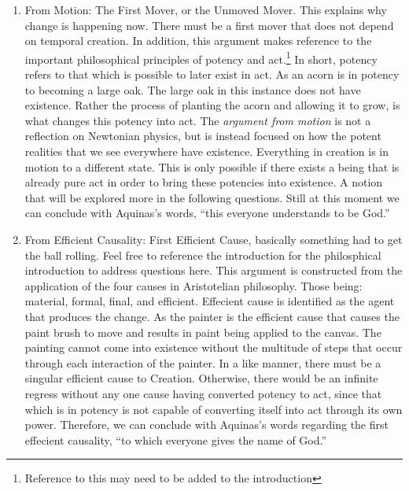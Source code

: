 \documentclass{ucetd}
\begin{document}
\begin{enumerate}
    \item From Motion: The First Mover, or the Unmoved Mover. This explains why change is happening now. There must be a first mover that does not depend on temporal creation. In addition, this argument makes reference to the important philosophical principles of potency and act.\footnote{Reference to this may need to be added to the introduction} In short, potency refers to that which is possible to later exist in act. As an acorn is in potency to becoming a large oak. The large oak in this instance does not have existence. Rather the process of planting the acorn and allowing it to grow, is what changes this potency into act. The \textit{argument from motion} is not a reflection on Newtonian physics, but is instead focused on how the potent realities that we see everywhere have existence. Everything in creation is in motion to a different state. This is only possible if there exists a being that is already pure act in order to bring these potencies into existence. A notion that will be explored more in the following questions. Still at this moment we can conclude with Aquinas's words, ``this everyone understands to be God.''
    \item From Efficient Causality: First Efficient Cause, basically something had to get the ball rolling. Feel free to reference the introduction for the philosphical introduction to address questions here. This argument is constructed from the application of the four causes in Aristotelian philosophy. Those being: material, formal, final, and efficient. Effecient cause is identified as the agent that produces the change. As the painter is the efficient cause that causes the paint brush to move and results in paint being applied to the canvas. The painting cannot come into existence without the multitude of steps that occur through each interaction of the painter. In a like manner, there must be a singular efficient cause to Creation. Otherwise, there would be an infinite regress without any one cause having converted potency to act, since that which is in potency is not capable of converting itself into act through its own power. Therefore, we can conclude with Aquinas's words regarding the first effecient causality, ``to which everyone gives the name of God.''

\end{enumerate}
\end{document}
